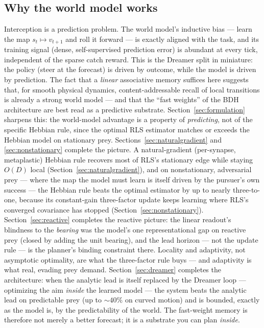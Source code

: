 \documentclass[11pt]{article}
\begin{document}
\subsection{Why the world model works}

Interception is a prediction problem. The world model's inductive bias --- learn the map
$s_t \mapsto v_{t+1}$ and roll it forward --- is exactly aligned with the task, and its
training signal (dense, self-supervised prediction error) is abundant at every tick, independent
of the sparse catch reward. This is the Dreamer split \cite{hafner2023} in miniature: the policy
(steer at the forecast) is driven by outcome, while the model is driven by prediction. The fact
that a \emph{linear} associative memory suffices here suggests that, for smooth physical
dynamics, content-addressable recall of local transitions is already a strong world model ---
and that the ``fast weights'' of the BDH architecture are best read as a predictive substrate.
Section~\ref{sec:formulation} sharpens this: the world-model advantage is a property of
\emph{predicting}, not of the specific Hebbian rule, since the optimal RLS estimator matches or
exceeds the Hebbian model on stationary prey. Sections~\ref{sec:naturalgradient} and
\ref{sec:nonstationary} complete the picture. A natural-gradient (per-synapse, metaplastic)
Hebbian rule recovers most of RLS's stationary edge while staying $O(D)$ local
(Section~\ref{sec:naturalgradient}), and on nonstationary, adversarial prey --- where the map the
model must learn is itself driven by the pursuer's own success --- the Hebbian rule beats the
optimal estimator by up to nearly three-to-one, because its constant-gain three-factor update keeps
learning where RLS's converged covariance has stopped (Section~\ref{sec:nonstationary}).
Section~\ref{sec:reactive} completes the reactive picture: the linear readout's blindness to the
\emph{bearing} was the model's one representational gap on reactive prey (closed by adding the unit
bearing), and the lead horizon --- not the update rule --- is the planner's binding constraint there.
Locality and adaptivity, not asymptotic optimality, are what the three-factor rule buys --- and
adaptivity is what real, evading prey demand. Section~\ref{sec:dreamer} completes the architecture:
when the analytic lead is itself replaced by the Dreamer loop --- optimizing the aim \emph{inside}
the learned model --- the system beats the analytic lead on predictable prey (up to $\sim\!40\%$ on
curved motion) and is bounded, exactly as the model is, by the predictability of the world. The
fast-weight memory is therefore not merely a better forecast; it is a substrate you can plan
\emph{inside}.
\end{document}

